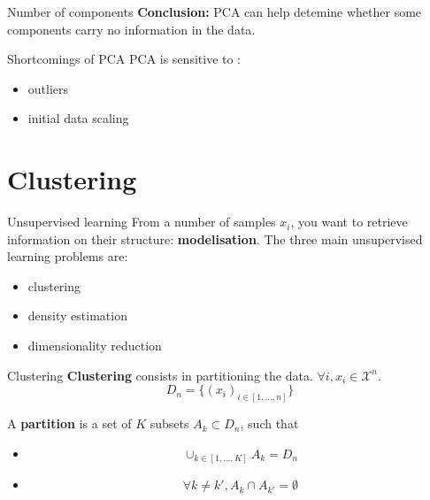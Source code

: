\documentclass[usenames,dvipsnames]{beamer}
\begin{document}
\begin{frame}{Number of components}
    \textbf{{Conclusion: }} PCA can help detemine whether some components carry no information in the data.
    
\end{frame}

\begin{frame}{Shortcomings of PCA}
   PCA is sensitive to :  
    \begin{itemize}
        \item outliers
	\item initial data scaling
    \end{itemize}
\end{frame}

\section{Clustering}

\begin{frame}{Unsupervised learning}
 From a number of samples ${x_i}$, you want to retrieve information on their structure: \textbf{{modelisation}}. The three main unsupervised learning problems are:
    \begin{itemize}
        \item clustering
	\item density estimation
	\item dimensionality reduction
    \end{itemize}
\end{frame}

\begin{frame}{Clustering}
   \textbf{{Clustering}}  consists in partitioning the data. $\forall i, x_i\in \mathcal{X}^n$.
    \begin{equation}
	D_n = \{(x_i)_{i\in [1, \dots, n]}\}
    \end{equation}

    A \textbf{{partition}} is a set of $K$ subsets $A_k\subset D_n$, such that
    \begin{itemize}
        \item
	    \begin{equation}
		\cup_{k\in [1, \dots, K]}A_k = D_n
	    \end{equation}
	\item 
	    \begin{equation}
		\forall k\neq k', A_k\cap A_{k'} = \emptyset
	    \end{equation}
    \end{itemize}
\end{frame}
\end{document}
